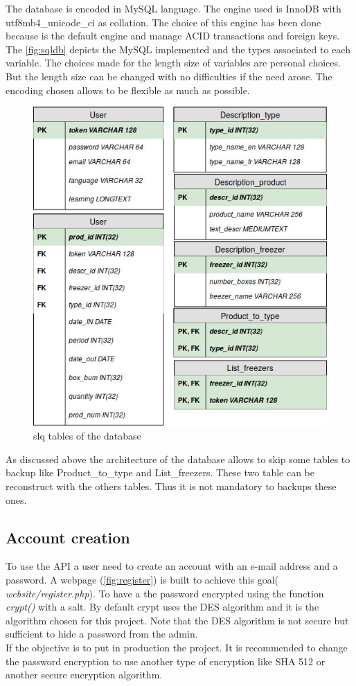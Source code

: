 The database is encoded in MySQL language. The engine used is InnoDB with utf8mb4\_unicode\_ci as collation. The choice of this engine has been done because is the default engine and manage ACID transactions and foreign keys. The \autoref{fig:sqldb} depicts the MySQL implemented and the types associated to each variable. The choices made for the length size of variables are personal choices. But the length size can be changed with no difficulties if the need arose. The encoding chosen allows to be flexible as much as possible.

\begin{figure}[H]
\centering
\includegraphics[scale=0.5]{./images/sqldb.jpg}
\caption{slq tables of the database}
\label{fig:sqldb}
\end{figure}

As discussed above the architecture of the database allows to skip some tables to backup like Product\_to\_type and List\_freezers. These two table can be reconstruct with the others tables. Thus it is not mandatory to backups these ones.

\subsection{Account creation}
To use the API a user need to create an account with an e-mail address and a password. A webpage (\autoref{fig:register}) is built to achieve this goal( \textit{website/register.php}). To have a the password encrypted using the function \textit{crypt()} with a salt. By default crypt uses the DES algorithm and it is the algorithm chosen for this project. Note that the DES algorithm is not secure but sufficient to hide a password from the admin.\\
If the objective is to put in production the project. It is recommended to change the  password encryption to use another type of encryption like SHA 512 or another secure encryption algorithm. \\

